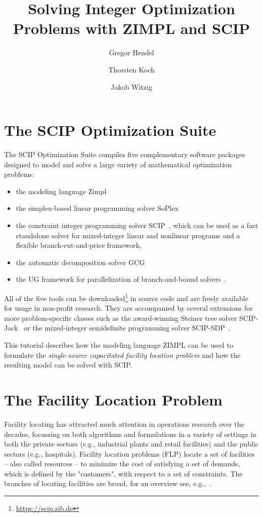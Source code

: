 \documentclass[a4paper,10pt]{article}
\title{Solving Integer Optimization Problems with ZIMPL and SCIP}
\author{Gregor Hendel\and
        Thorsten Koch\and
        Jakob Witzig}
\begin{document}
\maketitle

\section{The SCIP Optimization Suite}

The SCIP Optimization Suite compiles five complementary software packages designed to model and solve a large variety of mathematical optimization problems:
\begin{itemize}
  \item the modeling language Zimpl~\cite{koch2004rapid}
  \item the simplex-based linear programming solver SoPlex~\cite{Wunderling1996}
  \item the constraint integer programming solver SCIP~\cite{Achterberg2009}, which can be used as a fast standalone solver for mixed-integer linear and nonlinear programs and a flexible branch-cut-and-price framework,
  \item the automatic decomposition solver GCG~\cite{GamrathLuebbecke2010}
  \item the UG framework for parallelization of branch-and-bound solvers~\cite{Shinano2018}.
\end{itemize}
All of the five tools can be downloaded\footnote{\url{https://scip.zib.de}} in source code and are freely available for usage
in non-profit research.
They are accompanied by several extensions for more problem-specific classes
such as the award-winning Steiner tree solver SCIP-Jack~\cite{Gamrath2017scipjack}
or the mixed-integer semidefinite programming solver SCIP-SDP~\cite{GallyPfetschUlbrich2016}.

This tutorial describes how the modeling language ZIMPL can be used to formulate the \emph{single-source capacitated facility location problem}
and how the resulting model can be solved with SCIP.

\section{The Facility Location Problem}

Facility locating has attracted much attention in operations research over the decades,
focussing on both algorithms and formulations in a variety of settings in both the private sectors (e.g., industrial plants and retail facilities) and the public sectors (e.g., hospitals).
Facility location problems (FLP) locate a set of facilities -- also called resources -- to minimize the cost of satisfying a set of demands,
which is defined by the "customers", with respect to a set of constraints.
The branches of locating facilities are broad, for an overview see, e.g.,~\cite{aikens1985facility,brandeau1989overview}.
\end{document}
